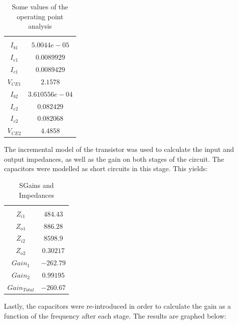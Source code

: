 \begin{table}[H]
    \addtolength{\tabcolsep}{-4pt}
    \caption{Some values of the operating point analysis}
    \vspace{-3mm}
    \begin{tabular}{|c|c|}
    \hline\\
    $I_{b1}$ &  $5.0044e-05$\\
    $I_{e1}$ &  $0.0089929$\\
    $I_{c1}$ &  $0.0089429$  \\ 
    $V_{CE1}$ & $ 2.1578$\\
    $I_{b2}$ &  $3.610556e-04$ \\
    $I_{e2}$ &  $0.082429$\\
    $I_{c2}$ &  $0.082068$\\
    $V_{CE2}$ & $4.4858$\\
    \hline
    \end{tabular}
    \label{tab:OP_mat}
\end{table}

The incremental model of the transistor was used to calculate the input and output impedances, as well as
the gain on both stages of the circuit. The capacitors were modelled as short circuits in this stage. This yields:

\begin{table}[H]
    \addtolength{\tabcolsep}{-4pt}
    \caption{SGains and Impedances}
    \vspace{-3mm}
    \begin{tabular}{|c|c|}
    \hline\\
    $Z_{i1}$ &  $484.43$\\
    $Z_{o1}$ &  $886.28$\\
    $Z_{i2}$ &  $8598.9$\\
    $Z_{o2}$ &  $0.30217$\\
    $Gain_1$ & $-262.79$\\
    $Gain_2$ &  $0.99195$\\
    $Gain_{Total}$ & $-260.67$\\
    \hline
    \end{tabular}
    \label{tab:Z_mat}
\end{table}

Lastly, the capacitors were re-introduced in order to calculate the gain as a function of the frequency after each stage.
The results are graphed below:


